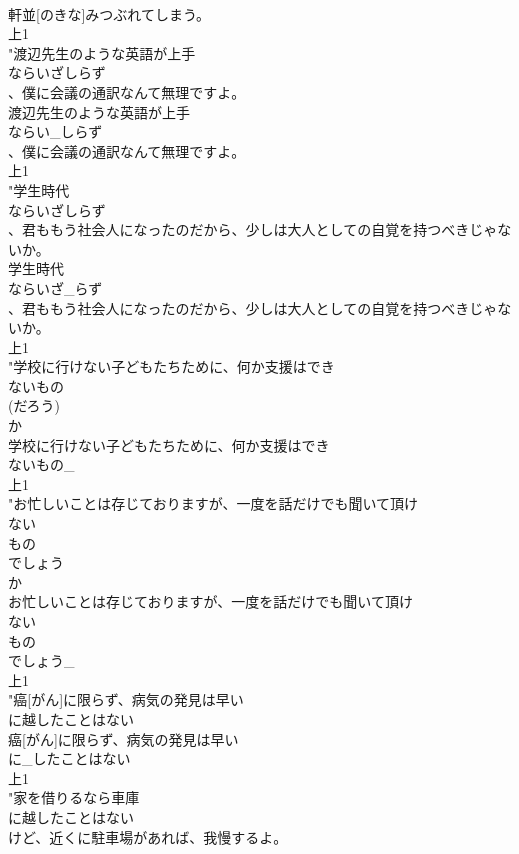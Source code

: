 \documentclass[8pt]{extreport}
\begin{document}
\begin{CJK}{UTF8}{min}
\\	軒並[のきな]みつぶれてしまう。
\\	上1
\\	"渡辺先生のような英語が上手
\\	ならいざしらず
\\	、僕に会議の通訳なんて無理ですよ。
\\	渡辺先生のような英語が上手
\\	ならい_しらず
\\	、僕に会議の通訳なんて無理ですよ。
\\	上1
\\	"学生時代
\\	ならいざしらず
\\	、君ももう社会人になったのだから、少しは大人としての自覚を持つべきじゃないか。
\\	学生時代
\\	ならいざ_らず
\\	、君ももう社会人になったのだから、少しは大人としての自覚を持つべきじゃないか。
\\	上1
\\	"学校に行けない子どもたちために、何か支援はでき
\\	ないもの
\\	(だろう)
\\	か
\\	学校に行けない子どもたちために、何か支援はでき
\\	ないもの_
\\	上1
\\	"お忙しいことは存じておりますが、一度を話だけでも聞いて頂け
\\	ない
\\	もの
\\	でしょう
\\	か
\\	お忙しいことは存じておりますが、一度を話だけでも聞いて頂け
\\	ない
\\	もの
\\	でしょう_
\\	上1
\\	"癌[がん]に限らず、病気の発見は早い
\\	に越したことはない
\\	癌[がん]に限らず、病気の発見は早い
\\	に_したことはない
\\	上1
\\	"家を借りるなら車庫
\\	に越したことはない
\\	けど、近くに駐車場があれば、我慢するよ。

\end{CJK}
\end{document}

